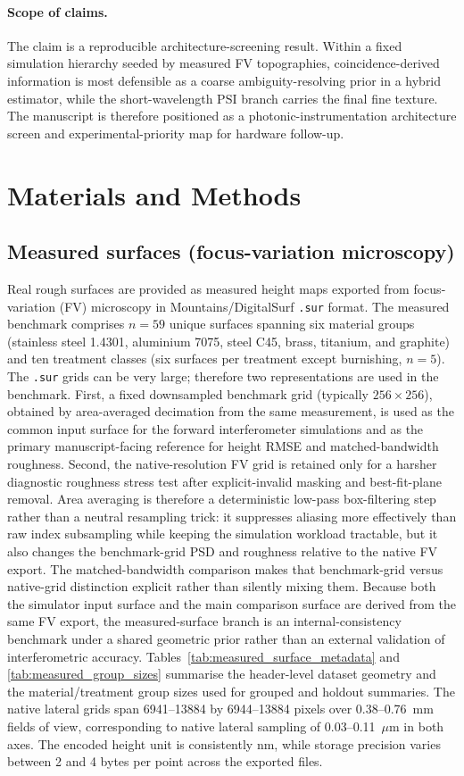 \documentclass[photonics,article,submit,pdftex,moreauthors]{Definitions/mdpi}
\begin{document}
\paragraph{Scope of claims.}
The claim is a reproducible architecture-screening result. Within a fixed simulation hierarchy seeded by measured FV topographies, coincidence-derived information is most defensible as a coarse ambiguity-resolving prior in a hybrid estimator, while the short-wavelength PSI branch carries the final fine texture. The manuscript is therefore positioned as a photonic-instrumentation architecture screen and experimental-priority map for hardware follow-up.

\section{Materials and Methods}
\subsection{Measured surfaces (focus-variation microscopy)}
Real rough surfaces are provided as measured height maps exported from focus-variation (FV) microscopy in Mountains/DigitalSurf \texttt{.sur} format. The measured benchmark comprises $n=59$ unique surfaces spanning six material groups (stainless steel 1.4301, aluminium 7075, steel C45, brass, titanium, and graphite) and ten treatment classes (six surfaces per treatment except burnishing, $n=5$). The \texttt{.sur} grids can be very large; therefore two representations are used in the benchmark. First, a fixed downsampled benchmark grid (typically $256\times 256$), obtained by area-averaged decimation from the same measurement, is used as the common input surface for the forward interferometer simulations and as the primary manuscript-facing reference for height RMSE and matched-bandwidth roughness. Second, the native-resolution FV grid is retained only for a harsher diagnostic roughness stress test after explicit-invalid masking and best-fit-plane removal. Area averaging is therefore a deterministic low-pass box-filtering step rather than a neutral resampling trick: it suppresses aliasing more effectively than raw index subsampling while keeping the simulation workload tractable, but it also changes the benchmark-grid PSD and roughness relative to the native FV export. The matched-bandwidth comparison makes that benchmark-grid versus native-grid distinction explicit rather than silently mixing them. Because both the simulator input surface and the main comparison surface are derived from the same FV export, the measured-surface branch is an internal-consistency benchmark under a shared geometric prior rather than an external validation of interferometric accuracy. Tables~\ref{tab:measured_surface_metadata} and \ref{tab:measured_group_sizes} summarise the header-level dataset geometry and the material/treatment group sizes used for grouped and holdout summaries. The native lateral grids span 6941--13884 by 6944--13884 pixels over 0.38--0.76~mm fields of view, corresponding to native lateral sampling of 0.03--0.11~$\mu$m in both axes. The encoded height unit is consistently nm, while storage precision varies between 2 and 4 bytes per point across the exported files.
\end{document}
